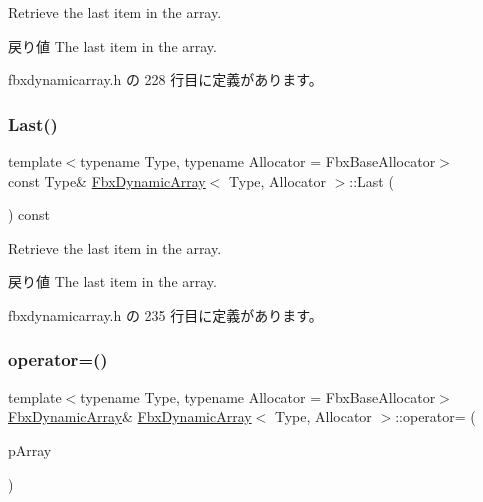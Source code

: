 Retrieve the last item in the array. \begin{DoxyReturn}{戻り値}
The last item in the array. 
\end{DoxyReturn}


 fbxdynamicarray.\+h の 228 行目に定義があります。

\mbox{\label{class_fbx_dynamic_array_a58a5256671ee30b3afcda3515543271f}} 
\subsubsection{\texorpdfstring{Last()}{Last()}\hspace{0.1cm}{\footnotesize\ttfamily [2/2]}}
{\footnotesize\ttfamily template$<$typename Type, typename Allocator = Fbx\+Base\+Allocator$>$ \\
const Type\& \hyperlink{class_fbx_dynamic_array}{Fbx\+Dynamic\+Array}$<$ Type, Allocator $>$\+::Last (\begin{DoxyParamCaption}{ }\end{DoxyParamCaption}) const\hspace{0.3cm}{\ttfamily [inline]}}

Retrieve the last item in the array. \begin{DoxyReturn}{戻り値}
The last item in the array. 
\end{DoxyReturn}


 fbxdynamicarray.\+h の 235 行目に定義があります。

\mbox{\label{class_fbx_dynamic_array_a9f14aeb23c8a864e9fdeeef12096a69a}} 
\subsubsection{\texorpdfstring{operator=()}{operator=()}}
{\footnotesize\ttfamily template$<$typename Type, typename Allocator = Fbx\+Base\+Allocator$>$ \\
\hyperlink{class_fbx_dynamic_array}{Fbx\+Dynamic\+Array}\& \hyperlink{class_fbx_dynamic_array}{Fbx\+Dynamic\+Array}$<$ Type, Allocator $>$\+::operator= (\begin{DoxyParamCaption}\item[{const \hyperlink{class_fbx_dynamic_array}{Fbx\+Dynamic\+Array}$<$ Type, Allocator $>$ \&}]{p\+Array }\end{DoxyParamCaption})\hspace{0.3cm}{\ttfamily [inline]}}

